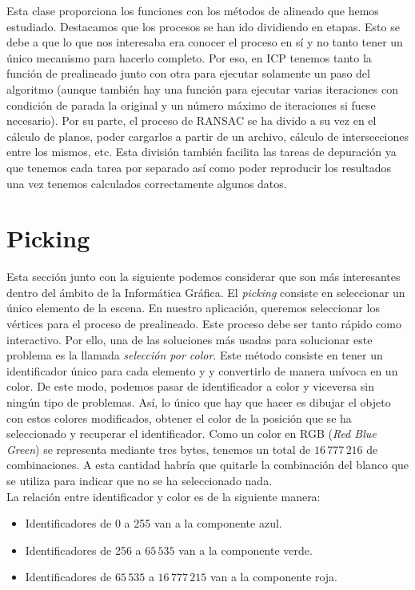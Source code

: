 Esta clase proporciona los funciones con los métodos de alineado que hemos estudiado. Destacamos que los procesos se han ido dividiendo en etapas. Esto se debe a que lo que nos interesaba era conocer el proceso en sí y no tanto tener un único mecanismo para hacerlo completo. Por eso, en ICP tenemos tanto la función de prealineado junto con otra para ejecutar solamente un paso del algoritmo (aunque también hay una función para ejecutar varias iteraciones con condición de parada la original y un número máximo de iteraciones si fuese necesario). Por su parte, el proceso de RANSAC se ha divido a su vez en el cálculo de planos, poder cargarlos a partir de un archivo, cálculo de intersecciones entre los mismos, etc. Esta división también facilita las tareas de depuración ya que tenemos cada tarea por separado así como poder reproducir los resultados una vez tenemos calculados correctamente algunos datos.

\section{Picking}\label{sec:picking}
Esta sección junto con la siguiente podemos considerar que son más interesantes dentro del ámbito de la Informática Gráfica. El \textit{picking} consiste en seleccionar un único elemento de la escena. En nuestro aplicación, queremos seleccionar los vértices para el proceso de prealineado. Este proceso debe ser tanto rápido como interactivo. Por ello, una de las soluciones más usadas para solucionar este problema es la llamada \textit{selección por color}. Este método consiste en tener un identificador único para cada elemento y y convertirlo de manera unívoca en un color. De este modo, podemos pasar de identificador a color y viceversa sin ningún tipo de problemas. Así, lo único que hay que hacer es dibujar el objeto con estos colores modificados, obtener el color de la posición que se ha seleccionado y recuperar el identificador. Como un color en RGB (\textit{Red Blue Green}) se representa mediante tres bytes, tenemos un total de $ 16\,777\,216 $ de combinaciones. A esta cantidad habría que quitarle la combinación del blanco que se utiliza para indicar que no se ha seleccionado nada. \\

La relación entre identificador y color es de la siguiente manera:
\begin{itemize}
	\item Identificadores de 0 a 255 van a la componente azul.
	\item Identificadores de 256 a $ 65\,535 $ van a la componente verde.
	\item Identificadores de $ 65\,535 $ a $ 16\,777\,215 $ van a la componente roja.
\end{itemize}

